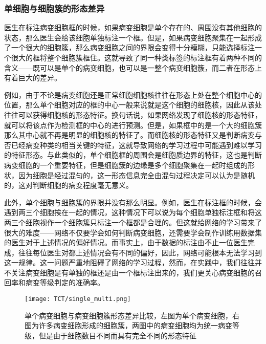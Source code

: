 \subsubsection{单细胞与细胞簇的形态差异}
\par 医生在标注病变细胞框的时候，如果病变细胞是单个存在的、周围没有其他细胞的状态，那么医生会给该细胞单独标注一个框。但是，如果病变细胞聚集在一起形成了一个很大的细胞簇，那么病变细胞之间的界限会变得十分糢糊，只能选择标注一个很大的框将整个细胞簇框住。这就导致了同一种类标签的标注框有着两种不同的含义——既可以是单个的病变细胞，也可以是一整个病变细胞簇，而二者在形态上有着巨大的差异。
\par 例如，由于不论是病变细胞还是正常细胞细胞核往往在形态上处在整个细胞中心的位置，那么单个细胞对应的框的中心一般来说就是这个细胞的细胞核，因此从该处往往可以获得细胞核的形态特征。换句话说，如果网络发现了细胞核的形态特征，就可以将该点作为检测框的中心的进行预测。但是，如果框中的是一个大的细胞簇那么其中心就不再是明显的细胞核的特征了。而细胞核的形态特征又是判断病变与否已经病变种类的相当关键的特征，这就导致网络的学习过程中可能遇到难以学习的特征形态。与此类似的，单个细胞框的周围会是细胞质边界的特征，这也是判断病变细胞的一个重要特征，但是细胞簇的边缘是多个细胞聚集在一起时组成的形状，因为细胞是经过混匀的，这一形态信息完全由混匀过程决定可以认为是随机的，这对判断细胞的病变程度毫无意义。
\par 此外，单个细胞与细胞簇的界限并没有那么明显。例如，医生在标注框的时候，会遇到两三个细胞挨在一起的情况，这种情况下可以说为每个细胞单独标注框和将这两三个细胞视作一个细胞簇只标注一个框都是合理的。但这就给网络的学习带来了很大的难度——网络不仅要学会如何判断病变细胞，还需要学会制作训练用数据集的医生对于上述情况的偏好情况。而事实上，由于数据的标注由不止一位医生完成，往往每位医生对都上述情况会有不同的偏好，因此，网络可能根本无法学习到这一规律。这一问题严重地阻碍了网络的学习过程，然而，在实践中，我们往往并不关注病变细胞是有单独的框还是由一个框标注出来的，我们更关心病变细胞的召回率和病变等级判定的准确率。
\begin{figure}[h]
    \centering
    \texttt{[image: TCT/single\_multi.png]}
    \caption{单个病变细胞与病变细胞簇形态差异比较，左图为单个病变细胞，右图为许多病变细胞形成的细胞簇，两图中的病变细胞均为统一病变等级，但是由于细胞数目不同而具有完全不同的形态特征}
    \label{形态差异}
\end{figure}
